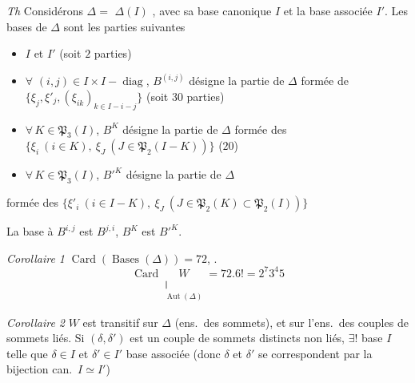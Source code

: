 \documentclass[11pt,a4paper]{article}
\begin{document}
\emph{Th} Considérons $\Delta =$  $\Delta(I)$
\struck{\ill{}},   avec sa base canonique \struck{\ill{}} $I$ et la base
associée $I'$. Les bases de $\Delta$ sont les parties  suivantes
\begin{itemize}
\item[(i)] $I$ et $I'$ (soit $2$ parties)
\item[(ii)] $\forall$  $(i,j) \in I \times
I - \operatorname{diag}$, $B^{(i,j)}$ désigne la partie de $\Delta$ formée
de $\lbrace \xi_j, \xi'_j, (\xi_{ik})_{k \in I - i - j} \rbrace$ (soit $30$
parties)
\item[(iii)] $\forall\, K \in \mathfrak{P}_3(I)$, $B^K$ désigne la partie de
$\Delta$ formée des $\lbrace \xi_i \ (i \in K), \ \xi_J \ (J \in
\mathfrak{P}_2(I - K)) \rbrace$ ($20$)
\item[(iv)] $\forall\, K \in \mathfrak{P}_3(I)$, $B'^K$ désigne la partie de
$\Delta$
\end{itemize}

formée des $\lbrace \xi'_i \ (i \in I - K), \ \xi_J \ (J \in
\mathfrak{P}_2(K) \subset \mathfrak{P}_2(I)) \rbrace$

La base \struck{\ill{}}  à $B^{i,j}$ est $B^{j,i}$,
\struck{\ill{}} \add{\ill{}} $B^{K}$ est $B'^{K}$.

\emph{Corollaire 1} $\operatorname{Card}(\operatorname{Bases}(\Delta)) = 72$,
 .
\[
\operatorname{Card} \underset{\substack{\Vert \\ \operatorname{Aut}(\Delta)}}{W} = 72 . 6! = 2^7 3^4 5
\]

\emph{Corollaire 2} $W$ est transitif sur $\Delta$ (ens.\ des sommets),
et \struck{\ill{}} sur l'ens.\ des couples de sommets 
 liés. Si $(\delta, \delta')$ est un couple de sommets distincts
non liés, $\exists!$ base $I$ telle que $\delta \in I$ \struck{\&} et
$\delta' \in I'$ base associée (donc $\delta$ et $\delta'$ se correspondent
par la bijection can.\ $I \simeq I'$)
\end{document}
